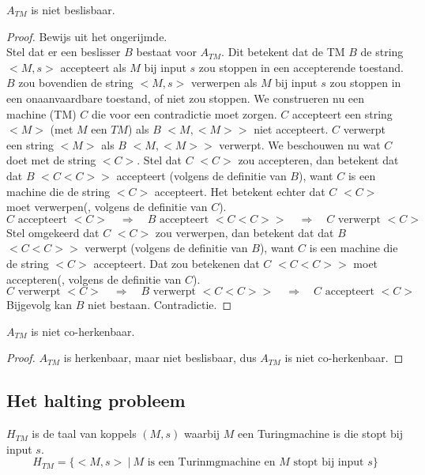\documentclass[main.tex]{subfiles}
\begin{document}
\begin{st}
  \label{st:a-tm-niet-besl}
  $A_{TM}$ is niet beslisbaar.

  \begin{proof}
    Bewijs uit het ongerijmde.\\
    Stel dat er een beslisser $B$ bestaat voor $A_{TM}$.
    Dit betekent dat de TM $B$ de string $<M,s>$ accepteert als $M$ bij input $s$ zou stoppen in een accepterende toestand.
    $B$ zou bovendien de string $<M,s>$ verwerpen als $M$ bij input $s$ zou stoppen in een onaanvaardbare toestand, of niet zou stoppen.
    We construeren nu een machine (TM) $C$ die voor een contradictie moet zorgen.
    $C$ accepteert een string $<M>$ (met $M$ een $TM$) als $B$ $<M,<M>>$ niet accepteert.
    $C$ verwerpt een string $<M>$ als $B$ $<M,<M>>$ verwerpt.
    We beschouwen nu wat $C$ doet met de string $<C>$.
    Stel dat $C$ $<C>$ zou accepteren, dan betekent dat dat $B$ $<C<C>>$ accepteert (volgens de definitie van $B$), want $C$ is een machine die de string $<C>$ accepteert.
    Het betekent echter dat $C$ $<C>$ moet verwerpen(, volgens de definitie van $C$).
    \[ C \text{ accepteert } <C> \quad\Rightarrow\quad B \text{ accepteert } <C<C>> \quad\Rightarrow\quad C \text{ verwerpt } <C> \]
    Stel omgekeerd dat $C$ $<C>$ zou verwerpen, dan betekent dat dat $B$ $<C<C>>$ verwerpt (volgens de definitie van $B$), want $C$ is een machine die de string $<C>$ accepteert.
    Dat zou betekenen dat $C$ $<C<C>>$ moet accepteren(, volgens de definitie van $C$).
    \[ C \text{ verwerpt } <C> \quad\Rightarrow\quad B \text{ verwerpt } <C<C>> \quad\Rightarrow\quad C \text{ accepteert } <C> \]
    Bijgevolg kan $B$ niet bestaan.
    Contradictie.
  \end{proof}
\end{st}

\begin{gev}
  \label{gev:a-tm-niet-coherk}
  $A_{TM}$ is niet co-herkenbaar.
  \begin{proof}
    $A_{TM}$ is herkenbaar, maar niet beslisbaar, dus $A_{TM}$ is niet co-herkenbaar.
  \end{proof}
\end{gev}

\subsection{Het halting probleem}

\begin{de}
  \label{de:h-tm}
  $H_{TM}$ is de taal van koppels $(M,s)$ waarbij $M$ een Turingmachine is die stopt bij input $s$.
  \[ H_{TM} = \{ <M,s> \ |\ M \text{ is een Turinmgmachine en } M \text{ stopt bij input } s \} \]
\end{de}
\end{document}
